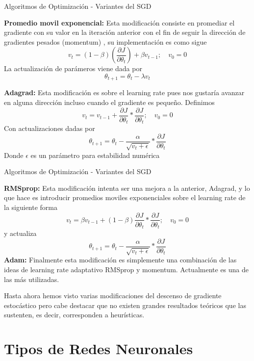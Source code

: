 \documentclass[9pt]{beamer}
\begin{document}
\begin{frame}{Algoritmos de Optimización - Variantes del SGD}

\textbf{Promedio movil exponencial: } Esta modificación consiste en promediar el gradiente con su valor en la iteración anterior con el fin de seguir la dirección de gradientes pesados (momentum) , su implementación es como sigue \pause
\[
v_t = (1-\beta) \left ( \frac{\partial J}{\partial \theta_t} \right ) + \beta v_{t-1};  \quad v_0 = 0
\] \pause
La actualización de parámeros viene dada por 
\[
\theta_{t+1} = \theta_t - \lambda v_t
\] \pause 

\textbf{Adagrad: } Esta modificación es sobre el learning rate pues nos gustaría avanzar en alguna dirección incluso cuando el gradiente es pequeño. Definimos \pause
\[
v_{t} = v_{t-1} +  \frac{\partial J}{\partial \theta_t} * \frac{\partial J}{\partial \theta_t} ; \quad v_0 = 0
\] 
Con actualizaciones dadas por \pause
\[
\theta_{t+1} = \theta_t - \frac{\alpha}{\sqrt{v_t + \epsilon}} * \frac{\partial J}{\partial \theta_t}
\]
Donde $\epsilon$ es un parámetro para estabilidad numérica

\end{frame}

\begin{frame}{Algoritmos de Optimización - Variantes del SGD}

\textbf{RMSprop: } Esta modificación intenta ser una mejora a la anterior, Adagrad, y lo que hace es introducir promedios moviles exponenciales sobre el learning rate de la siguiente forma \pause
\[
v_t = \beta v_{t-1} + (1-\beta)\frac{\partial J}{\partial \theta_t} * \frac{\partial J}{\partial \theta_t} ; \quad v_0 = 0
\] \pause
y actualiza 
\[
\theta_{t+1} = \theta_t - \frac{\alpha}{\sqrt{v_t + \epsilon}} * \frac{\partial J}{\partial \theta_t}
\] \pause 
\textbf{Adam: } Finalmente esta modificación es simplemente una combinación de las ideas de  learning rate adaptativo RMSprop y momentum. Actualmente es una de las más utilizadas. \pause

\vspace{0.2cm}

\begin{observacion}
Hasta ahora hemos visto varias modificaciones del descenso de gradiente estocástico pero cabe destacar que no existen grandes resultados teóricos que las sustenten, es decir, corresponden a heurísticas.
\end{observacion}
\end{frame}

\section{Tipos de Redes Neuronales}
\end{document}

